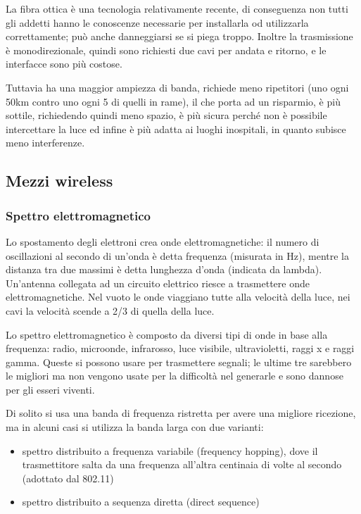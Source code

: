 La fibra ottica è una tecnologia relativamente recente, di conseguenza non tutti gli addetti hanno le conoscenze necessarie per installarla od utilizzarla correttamente;
può anche danneggiarsi se si piega troppo. 
Inoltre la trasmissione è monodirezionale, quindi sono richiesti due cavi per andata e ritorno, e le interfacce sono più costose.

Tuttavia ha una maggior ampiezza di banda, richiede meno ripetitori (uno ogni 50km contro uno ogni 5 di quelli in rame), il che porta ad un risparmio,
è più sottile, richiedendo quindi meno spazio, è più sicura perché non è possibile intercettare la luce ed infine è più adatta ai luoghi inospitali, in quanto subisce meno interferenze.

\subsection{Mezzi wireless}

\subsubsection{Spettro elettromagnetico}
Lo spostamento degli elettroni crea onde elettromagnetiche:
il numero di oscillazioni al secondo di un'onda è detta frequenza (misurata in Hz),
mentre la distanza tra due massimi è detta lunghezza d'onda (indicata da lambda).
Un'antenna collegata ad un circuito elettrico riesce a trasmettere onde elettromagnetiche.
Nel vuoto le onde viaggiano tutte alla velocità della luce, nei cavi la velocità scende a 2/3 di quella della luce.

Lo spettro elettromagnetico è composto da diversi tipi di onde in base alla frequenza:
radio, microonde, infrarosso, luce visibile, ultravioletti, raggi x e raggi gamma.
Queste si possono usare per trasmettere segnali; le ultime tre sarebbero le migliori ma non vengono usate per la difficoltà nel generarle e sono dannose per gli esseri viventi.

Di solito si usa una banda di frequenza ristretta per avere una migliore ricezione, ma in alcuni casi si utilizza la banda larga con due varianti:
\begin{itemize}
\item spettro distribuito a frequenza variabile (frequency hopping), dove il trasmettitore salta da una frequenza all'altra centinaia di volte al secondo (adottato dal 802.11)
\item spettro distribuito a sequenza diretta (direct sequence)
\end{itemize}

